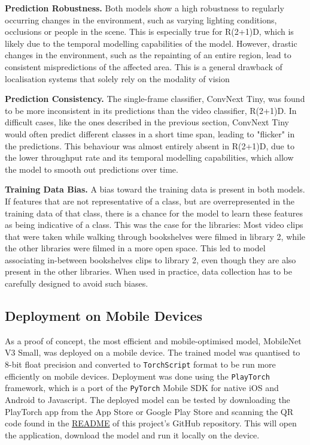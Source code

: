 \documentclass[a4paper]{article}
\begin{document}
\textbf{Prediction Robustness.} Both models show a high robustness to regularly
occurring changes in the environment, such as varying lighting conditions,
occlusions or people in the scene. This is especially true for R(2+1)D, which is
likely due to the temporal modelling capabilities of the model. However, drastic
changes in the environment, such as the repainting of an entire region, lead to
consistent mispredictions of the affected area. This is a general drawback of
localisation systems that solely rely on the modality of vision 

\textbf{Prediction Consistency.} The single-frame classifier, ConvNext Tiny, was
found to be more inconsistent in its predictions than the video classifier,
R(2+1)D. In difficult cases, like the ones described in the previous section,
ConvNext Tiny would often predict different classes in a short time span,
leading to "flicker" in the predictions. This behaviour was almost entirely
absent in R(2+1)D, due to the lower throughput rate and its temporal modelling
capabilities, which allow the model to smooth out predictions over time.

\textbf{Training Data Bias.} A bias toward the training data is present in both
models. If features that are not representative of a class, but are
overrepresented in the training data of that class, there is a chance for the
model to learn these features as being indicative of a class. This was the case
for the libraries: Most video clips that were taken while walking through
bookshelves were filmed in library 2, while the other libraries were filmed in a
more open space. This led to model associating in-between bookshelves clips to
library 2, even though they are also present in the other libraries. When used
in practice, data collection has to be carefully designed to avoid such biases.


\subsection{Deployment on Mobile Devices}
\label{sub:deploment}

As a proof of concept, the most efficient and mobile-optimised model, MobileNet
V3 Small, was deployed on a mobile device. The trained model was quantised to
8-bit float precision and converted to \texttt{TorchScript} format to be run
more efficiently on mobile devices. Deployment was done using the
\texttt{PlayTorch} framework, which is a port of the \texttt{PyTorch} Mobile SDK
for native iOS and Android to Javascript. The deployed model can be tested by
downloading the PlayTorch app from the App Store or Google Play Store and
scanning the QR code found in the \href{https://github.com/mikasenghaas/bsc}{README}
of this project's GitHub repository. This will open the application, download
the model and run it locally on the device.
\end{document}
